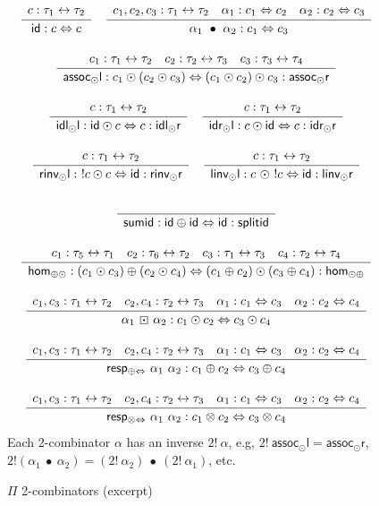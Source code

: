 \documentclass[a4paper,USenglish]{lipics-v2016-utf8x}
\newcommand{\iso}{\leftrightarrow}
\newcommand{\isotwo}{\Leftrightarrow}
\newcommand{\Rule}[4]{
\makebox{{\rm #1}
$\displaystyle
\frac{\begin{array}{l}#2\\\end{array}}
{\begin{array}{l}#3\\\end{array}}$
 #4}}
\newcommand{\jdg}[3]{{#1} #3}
\newcommand{\idiso}{\mathsf{{id}}}
\newcommand{\assocdl}{\mathsf{{assoc_{\odot}l}}}
\newcommand{\assocdr}{\mathsf{{assoc_{\odot}r}}}
\newcommand{\idldl}{\mathsf{{idl_{\odot}l}}}
\newcommand{\idldr}{\mathsf{{idl_{\odot}r}}}
\newcommand{\idrdl}{\mathsf{{idr_{\odot}l}}}
\newcommand{\idrdr}{\mathsf{{idr_{\odot}r}}}
\newcommand{\rinvdl}{\mathsf{{rinv_{\odot}l}}}
\newcommand{\rinvdr}{\mathsf{{rinv_{\odot}r}}}
\newcommand{\linvdl}{\mathsf{{linv_{\odot}l}}}
\newcommand{\linvdr}{\mathsf{{linv_{\odot}r}}}
\newcommand{\idisotwo}{\mathsf{{id}}}
\newcommand{\transtwo}{\bullet}
\newcommand{\respstwo}{\mathsf{{\boxdot}}}
\newcommand{\respptwo}{\mathsf{{resp_{\oplus\Leftrightarrow}}}}
\newcommand{\respttwo}{\mathsf{{resp_{\otimes\Leftrightarrow}}}}
\newcommand{\sumid}{\mathsf{sumid}}
\newcommand{\splitid}{\mathsf{splitid}}
\newcommand{\homps}{\mathsf{hom_{\oplus\odot}}}
\newcommand{\homsp}{\mathsf{hom_{\odot\oplus}}}
\begin{document}
\begin{figure}[t]
\[\begin{array}{c}
\Rule{}
{c : \tau_1 \iso \tau_2}
{\jdg{}{}{\idisotwo : c \isotwo c}}
{}
~
\Rule{}
{c_1,c_2,c_3 : \tau_1 \iso \tau_2 \quad \alpha_1 : c_1 \isotwo c_2 \quad \alpha_2 : c_2 \isotwo c_3}
{\jdg{}{}{\alpha_1~\transtwo~\alpha_2 : c_1 \isotwo c_3}}
{}
\\
\\
\Rule{}
{c_1 : \tau_1 \iso \tau_2 \quad c_2 : \tau_2 \iso \tau_3 \quad c_3 : \tau_3 \iso \tau_4}
{\jdg{}{}{\assocdl : c_1 \odot (c_2 \odot c_3) \isotwo (c_1 \odot c_2) \odot c_3 : \assocdr}}
{}
\\
\\
\Rule{}
{c : \tau_1 \iso \tau_2}
{\jdg{}{}{\idldl : \idiso \odot c \isotwo c : \idldr}}
{}
~
\Rule{}
{c : \tau_1 \iso \tau_2}
{\jdg{}{}{\idrdl : c \odot \idiso \isotwo c : \idrdr}}
{}
\\
\\
\Rule{}
{c : \tau_1 \iso \tau_2}
{\jdg{}{}{\rinvdl : ~! c \odot c \isotwo \idiso : \rinvdr}}
{}
~
\Rule{}
{c : \tau_1 \iso \tau_2}
{\jdg{}{}{\linvdl : c ~\odot ~! c \isotwo \idiso : \linvdr}}
{}
\\
\\
\Rule{}
{}
{\jdg{}{}{\sumid : \idiso\oplus\idiso \isotwo \idiso : \splitid}}
{}
\\
\\
\Rule{}
{c_1 : \tau_5\iso\tau_1 \quad c_2 : \tau_6\iso\tau_2 \quad c_3 :
    \tau_1\iso\tau_3 \quad c_4 : \tau_2\iso\tau_4}
{\jdg{}{}{\homps : (c_1\odot c_3)\oplus(c_2\odot c_4) \isotwo
    (c_1\oplus c_2) \odot (c_3\oplus c_4) : \homsp }}
{}
\\
\\
\Rule{}
{c_1,c_3 : \tau_1 \iso \tau_2 \quad c_2,c_4 : \tau_2 \iso \tau_3 \quad
  \alpha_1 : c_1 \isotwo c_3 \quad \alpha_2 : c_2 \isotwo c_4}
{\jdg{}{}{\alpha_1 ~\respstwo~ \alpha_2 : c_1 \odot c_2 \isotwo c_3 \odot c_4}}
{}
\\
\\
\Rule{}
{c_1,c_3 : \tau_1 \iso \tau_2 \quad c_2,c_4 : \tau_2 \iso \tau_3 \quad
  \alpha_1 : c_1 \isotwo c_3 \quad \alpha_2 : c_2 \isotwo c_4}
{\jdg{}{}{\respptwo ~\alpha_1 ~\alpha_2 : c_1 \oplus c_2 \isotwo c_3 \oplus c_4}}
{}
\\
\\
\Rule{}
{c_1,c_3 : \tau_1 \iso \tau_2 \quad c_2,c_4 : \tau_2 \iso \tau_3 \quad
  \alpha_1 : c_1 \isotwo c_3 \quad \alpha_2 : c_2 \isotwo c_4}
{\jdg{}{}{\respttwo ~\alpha_1 ~\alpha_2 : c_1 \otimes c_2 \isotwo c_3 \otimes c_4}}
{}
\end{array}\]
Each 2-combinator $\alpha$ has an inverse $2!~\alpha$, e.g, $2!~\assocdl=\assocdr$,
$2!(\alpha_1~\transtwo~\alpha_2) = (2!~\alpha_2)~\transtwo~(2!~\alpha_1)$, etc.
\caption{$\Pi$ 2-combinators (excerpt)~\cite{Carette2016}
\label{pi-combinators2}}
\end{figure}
\end{document}
